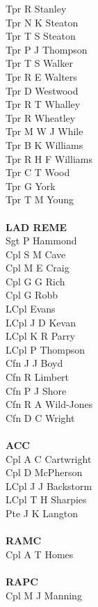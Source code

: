 \begin{multicols}{4}
  Tpr R Stanley \\
  Tpr N K Steaton \\
  Tpr T S Steaton \\
  Tpr P J Thompson \\
  Tpr T S Walker \\
  Tpr R E Walters \\
  Tpr D Westwood \\
  Tpr R T Whalley \\
  Tpr R Wheatley \\
  Tpr M W J While \\
  Tpr B K Williams \\
  Tpr R H F Williams \\
  Tpr C T Wood \\
  Tpr G York \\
  Tpr T M Young \\
  \\
  \textbf{LAD REME} \\
  Sgt P Hammond \\
  Cpl S M Cave \\
  Cpl M E Craig \\
  Cpl G G Rich \\
  Cpl G Robb \\
  LCpl Evans \\
  LCpl J D Kevan \\
  LCpl K R Parry \\
  LCpl P Thompson \\
  Cfn J J Boyd \\
  Cfn R Limbert \\
  Cfn P J Shore \\
  Cfn R A Wild-Jones \\
  Cfn D C Wright \\
  \\
  \textbf{ACC} \\
  Cpl A C Cartwright \\
  Cpl D McPherson \\
  LCpl J J Backstorm \\
  LCpl T H Sharpies \\
  Pte J K Langton \\
  \\
  \textbf{RAMC} \\
  Cpl A T Homes \\
  \\
  \textbf{RAPC} \\
  Cpl M J Manning \\
  \\

\end{multicols}
